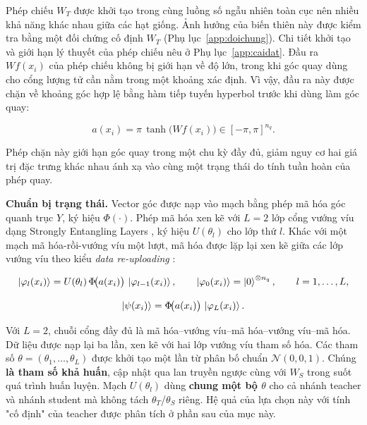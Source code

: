 Phép chiếu $W_T$ được khởi tạo trong cùng luồng số ngẫu nhiên toàn cục
nên nhiều khả năng khác nhau giữa các hạt giống. Ảnh hưởng của biến thiên
này được kiểm tra bằng một đối chứng cố định $W_T$
(Phụ lục~\ref{app:doichung}). Chi tiết khởi tạo và giới hạn lý thuyết của phép
chiếu nêu ở Phụ lục~\ref{app:caidat}. Đầu ra $Wf(x_i)$ của phép chiếu
không bị giới hạn về độ lớn, trong khi góc quay dùng cho cổng lượng tử
cần nằm trong một khoảng xác định. Vì vậy, đầu ra này được chặn về
khoảng góc hợp lệ bằng hàm tiếp tuyến hyperbol trước khi dùng làm góc
quay:

\begin{equation}
\label{eq:angles}
a(x_i) = \pi \, \tanh\!\big( W f(x_i) \big) \in [-\pi, \pi]^{n_q}.
\end{equation}

Phép chặn này giới hạn góc quay trong một chu kỳ đầy đủ, giảm nguy cơ hai
giá trị đặc trưng khác nhau ánh xạ vào cùng một trạng thái do tính tuần hoàn
của phép quay.

\textbf{Chuẩn bị trạng thái.} Vector góc được nạp vào mạch bằng phép mã hóa góc quanh trục $Y$, ký hiệu $\Phi(\cdot)$. Phép mã hóa xen kẽ với $L = 2$ lớp cổng vướng víu dạng Strongly Entangling Layers \cite{schuld2020circuitcentric}, ký hiệu $U(\theta_l)$ cho lớp thứ $l$. Khác với một mạch mã hóa-rồi-vướng víu một
lượt, mã hóa được lặp lại xen kẽ giữa các lớp vướng víu theo kiểu
\emph{data re-uploading} \cite{perezsalinas2020data}:

\begin{equation}
\label{eq:layer}
\ket{\varphi_l(x_i)} = U(\theta_l)\,\Phi\!\big(a(x_i)\big)\,\ket{\varphi_{l-1}(x_i)},
\qquad
\ket{\varphi_0(x_i)} = \ket{0}^{\otimes n_q},
\qquad l = 1,\ldots,L,
\end{equation}

\begin{equation}
\label{eq:state}
\ket{\psi(x_i)} = \Phi\!\big(a(x_i)\big)\,\ket{\varphi_L(x_i)}.
\end{equation}

Với $L=2$, chuỗi cổng đầy đủ là mã hóa--vướng víu--mã hóa--vướng víu--mã hóa.
Dữ liệu được nạp lại ba lần, xen kẽ với hai lớp vướng víu tham số hóa. Các
tham số $\theta = (\theta_1,\ldots,\theta_L)$ được khởi tạo một lần từ phân
bố chuẩn $\mathcal{N}(0, 0{,}1)$. Chúng \textbf{là tham số khả huấn}, cập nhật
qua lan truyền ngược cùng với $W_S$ trong suốt quá trình huấn luyện. Mạch
$U(\theta_l)$ dùng \textbf{chung một bộ $\theta$} cho cả nhánh teacher và
nhánh student mà không tách $\theta_T$/$\theta_S$ riêng. Hệ quả của lựa chọn
này với tính "cố định" của teacher được phân tích ở phần sau của mục này.

